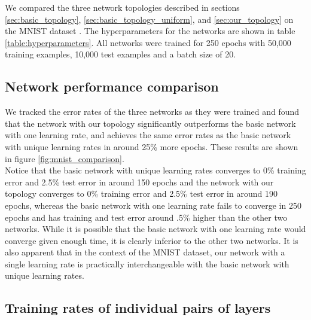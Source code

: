 \documentclass[format=sigconf]{acmart}
\newcommand{\npar}{\\\indent}
\begin{document}
We compared the three network topologies described in sections \ref{sec:basic_topology}, \ref{sec:basic_topology_uniform}, and \ref{sec:our_topology} on the MNIST dataset \cite{mnist1998}. The hyperparameters for the networks are shown in table \ref{table:hyperparameters}. All networks were trained for 250 epochs with 50,000 training examples, 10,000 test examples and a batch size of 20.

\subsection{Network performance comparison}
\label{sec:network_performance}

We tracked the error rates of the three networks as they were trained and found that the network with our topology significantly outperforms the basic network with one learning rate, and achieves the same error rates as the basic network with unique learning rates in around 25\% more epochs. These results are shown in figure \ref{fig:mnist_comparison}.
\npar
 Notice that the basic network with unique learning rates converges to 0\% training error and 2.5\% test error in around 150 epochs and the network with our topology converges to 0\% training error and 2.5\% test error in around 190 epochs, whereas the basic network with one learning rate fails to converge in 250 epochs and has training and test error around .5\% higher than the other two networks. While it is possible that the basic network with one learning rate would converge given enough time, it is clearly inferior to the other two networks. It is also apparent that in the context of the MNIST dataset, our network with a single learning rate is practically interchangeable with the basic network with unique learning rates.

\subsection{Training rates of individual pairs of layers}
\label{sec:mnist_perlayer}
\end{document}
